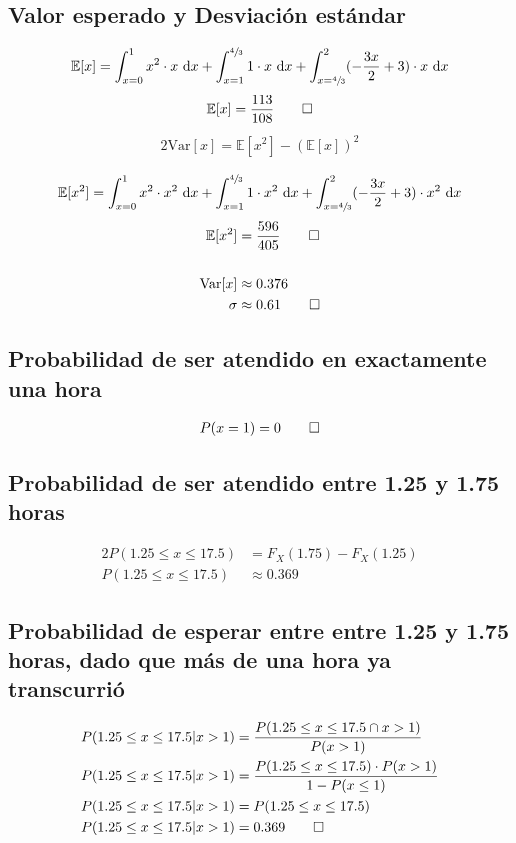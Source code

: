 \documentclass[paper=letterpaper]{article}
\begin{document}
\subsection{Valor esperado y Desviaci\'{o}n est\'{a}ndar}
\begin{alignat*}{2}
\mathbb{E}[x] = \int_{x = 0}^{1} x^2 \cdot x ~\text{d}x + \int_{x = 1}^{\sfrac{4}{3}} 1 \cdot x ~\text{d}x  + \int_{x = \sfrac{4}{3}}^{2} (-\frac{3x}{2} + 3) \cdot x ~\text{d}x
\end{alignat*}
\begin{alignat*}{2}
\mathbb{E}[x] = \frac{113}{108} \qed
\end{alignat*}
\begin{alignat*}{2}
\text{Var}[x] = \mathbb{E}[x^2] - (\mathbb{E}[x])^2 \\ 
\end{alignat*}
\begin{alignat*}{2}
\mathbb{E}[x^2] = \int_{x = 0}^{1} x^2 \cdot x^2 ~\text{d}x + \int_{x = 1}^{\sfrac{4}{3}} 1 \cdot x^2 ~\text{d}x  + \int_{x = \sfrac{4}{3}}^{2} (-\frac{3x}{2} + 3) \cdot x^2 ~\text{d}x
\end{alignat*}
\begin{alignat*}{2}
\mathbb{E}[x^2] &= \frac{596}{405} \qed \\ \\
\text{Var}[x] &\approx 0.376 \\
\sigma &\approx 0.61 \qed
\end{alignat*}

\subsection{Probabilidad de ser atendido en exactamente una hora}
\begin{alignat*}{2}
P(x = 1) = 0 \qed
\end{alignat*}

\subsection{Probabilidad de ser atendido entre 1.25 y 1.75 horas}
\begin{alignat*}{2}
P(1.25 \leq x \leq 17.5) &= F_X(1.75)-F_X(1.25) \\
P(1.25 \leq x \leq 17.5) &\approx 0.369
\end{alignat*}

\subsection{Probabilidad de esperar entre entre 1.25 y 1.75 horas, dado que m\'{a}s de una hora ya transcurri\'{o}}
\begin{alignat*}{2}
P(1.25 \leq x \leq 17.5 \vert x > 1) &= \frac{P(1.25 \leq x \leq 17.5 \cap x > 1)}{P(x > 1)} \\
P(1.25 \leq x \leq 17.5 \vert x > 1) &= \frac{P(1.25 \leq x \leq 17.5) \cdot P(x > 1)}{1 - P(x \leq 1)} \\
P(1.25 \leq x \leq 17.5 \vert x > 1) &= P(1.25 \leq x \leq 17.5) \\
P(1.25 \leq x \leq 17.5 \vert x > 1) &= 0.369 \qed
\end{alignat*}
\end{document}
